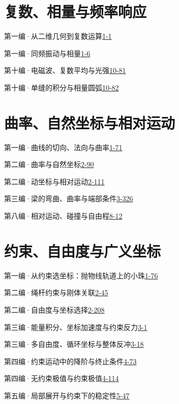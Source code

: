 \section*{复数、相量与频率响应}
\noindent 第一编·从二维几何到复数运算\quad\href{course-page:1:6}{1-1}\par
\noindent 第一编·同频振动与相量\quad\href{course-page:1:11}{1-6}\par
\noindent 第十编·电磁波、复数平均与光强\quad\href{course-page:10:85}{10-81}\par
\noindent 第十编·单缝的积分与相量圆弧\quad\href{course-page:10:86}{10-82}\par
\section*{曲率、自然坐标与相对运动}
\noindent 第一编·曲线的切向、法向与曲率\quad\href{course-page:1:76}{1-71}\par
\noindent 第二编·曲率与自然坐标\quad\href{course-page:2:92}{2-90}\par
\noindent 第二编·动坐标与相对运动\quad\href{course-page:2:113}{2-111}\par
\noindent 第三编·梁的弯曲、曲率与端部条件\quad\href{course-page:3:329}{3-326}\par
\noindent 第八编·相对运动、碰撞与自由程\quad\href{course-page:8:15}{8-12}\par
\section*{约束、自由度与广义坐标}
\noindent 第一编·从约束选坐标：抛物线轨道上的小珠\quad\href{course-page:1:81}{1-76}\par
\noindent 第二编·绳杆约束与刚体关联\quad\href{course-page:2:47}{2-45}\par
\noindent 第二编·自由度与坐标选择\quad\href{course-page:2:210}{2-208}\par
\noindent 第三编·能量积分、坐标加速度与约束反力\quad\href{course-page:3:4}{3-1}\par
\noindent 第三编·多自由度、循环坐标与整体反冲\quad\href{course-page:3:21}{3-18}\par
\noindent 第四编·约束运动中的降阶与终止条件\quad\href{course-page:4:75}{4-73}\par
\noindent 第四编·无约束极值与约束极值\quad\href{course-page:4:116}{4-114}\par
\noindent 第五编·局部展开与约束下的稳定性\quad\href{course-page:5:49}{5-47}\par
